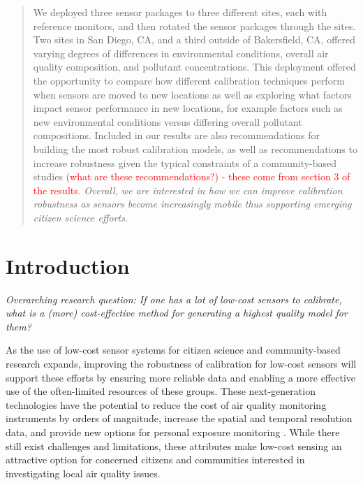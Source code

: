 \documentclass[journal abbreviation, manuscript]{copernicus}
\newcommand\todo[1]{\textcolor{red}{#1}}
\begin{document}
\begin{abstract}
We deployed three sensor packages to three different sites, each with reference monitors, and then rotated the sensor packages through the sites. Two sites in San Diego, CA, and a third outside of Bakersfield, CA, offered varying degrees of differences in environmental conditions, overall air quality composition, and pollutant concentrations. This deployment offered the opportunity to compare how different calibration techniques perform when sensors are moved to new locations as well as exploring what factors impact sensor performance in new locations, for example factors such as new environmental conditions versus differing overall pollutant compositions. Included in our results are also recommendations for building the most robust calibration models, as well as recommendations to increase robustness given the typical constraints of a community-based studies \todo{(what are these recommendations?) - these come from section 3 of the results}. \emph{Overall, we are interested in how we can improve calibration robustness as sensors become increasingly mobile thus supporting emerging citizen science efforts.}

\end{abstract}

\section{Introduction}

\emph{Overarching research question: If one has a lot of low-cost sensors to calibrate, what is a (more) cost-effective method for generating a highest quality model for them?}

As the use of low-cost sensor systems for citizen science and community-based research expands, improving the robustness of calibration for low-cost sensors will support these efforts by ensuring more reliable data and enabling a more effective use of the often-limited resources of these groups. These next-generation technologies have the potential to reduce the cost of air quality monitoring instruments by orders of magnitude, increase the spatial and temporal resolution data, and provide new options for personal exposure monitoring \citep{Snyder2013}.  While there still exist challenges and limitations, these attributes make low-cost sensing an attractive option for concerned citizens and communities interested in investigating local air quality issues. 
\end{document}
